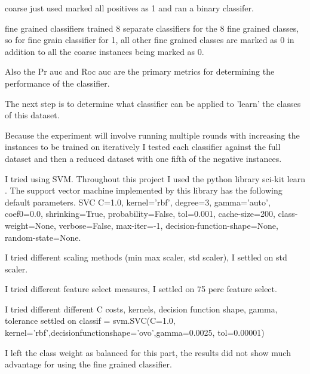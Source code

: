 \documentclass[ms]{nuthesis}
\begin{document}
\par coarse just used marked all positives as 1 and ran a binary classifer.
\par fine grained classifiers trained 8 separate classifiers for the 8 fine grained
classes, so for fine grain classifier for 1, all other fine grained classes are marked as 0
in addition to all the coarse instances being marked as 0.
\par Also the Pr auc and Roc auc are the primary metrics for determining the performance
of the classifier.
\par The next step is to determine what classifier can be applied to 'learn' the classes of
this dataset.
\par Because the experiment will involve running multiple rounds with increasing the instances to
 be trained on iteratively I tested each classifier against the full dataset and then a reduced
 dataset with one fifth of the negative instances.



\par I tried using SVM. Throughout this project I used the python library sci-kit learn \cite{scikit-learn}.
The support vector machine implemented by this library has the following default parameters. SVC C=1.0,
kernel='rbf', degree=3, gamma='auto', coef0=0.0, shrinking=True, probability=False, tol=0.001, cache-size=200,
class-weight=None, verbose=False, max-iter=-1, decision-function-shape=None, random-state=None.
\par I tried different scaling methods (min max scaler, std scaler), I settled on std scaler.



\par I tried different feature select measures, I settled on 75 perc feature select.



\par I tried different different C costs, kernels, decision function shape, gamma, tolerance
settled on classif = svm.SVC(C=1.0, kernel='rbf',decisionfunctionshape='ovo',gamma=0.0025,
 tol=0.00001)



\par I left the class weight as balanced for this part, the results did not show much advantage
for using the fine grained classifier.
\end{document}
